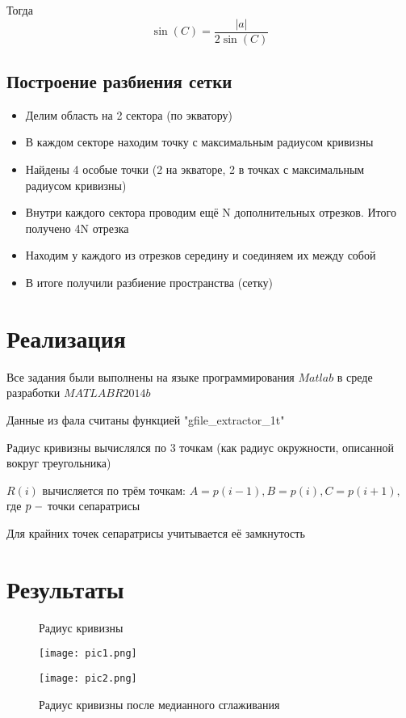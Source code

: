 \documentclass[a4]{article}
\begin{document}
Тогда 
\begin{equation}
    \sin(C)=\frac{\vert a\vert}{2\sin(C)}
\end{equation}

\subsection{Построение разбиения сетки}
\begin{itemize}
    \item Делим область на 2 сектора (по экватору)

\item В каждом секторе находим точку с максимальным радиусом кривизны

\item Найдены 4 особые точки (2 на экваторе, 2 в точках с максимальным радиусом кривизны)

\item Внутри каждого сектора проводим ещё N дополнительных отрезков. Итого получено 4N отрезка

\item Находим у каждого из отрезков середину и соединяем их между собой

\item В итоге получили разбиение пространства (сетку)
\end{itemize}

\section{Реализация}
Все задания были выполнены на языке программирования $Matlab$ в среде разработки $MATLAB R2014b$ \hfill \cite{1}

Данные из фала считаны функцией "gfile\_extractor\_1t" \hfill\cite{2}

Радиус кривизны вычислялся по $3$ точкам (как радиус окружности, описанной вокруг треугольника)

$R(i)$ вычисляется по трём точкам: $A = p(i-1), B = p(i), C = p(i+1),$ где $p\;\--$ точки сепаратрисы

Для крайних точек сепаратрисы учитывается её замкнутость


\section{Результаты}

\begin{figure}[H]
\begin{center}
\caption{Радиус кривизны }
\texttt{[image: pic1.png]} 

\caption{Радиус кривизны после медианного сглаживания}
\texttt{[image: pic2.png]} 
\end{center}
\end{figure}
\end{document}
